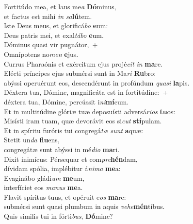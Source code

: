 \evenverse Fortitúdo mea, et laus me\textit{a} \textbf{Dó}minus,~\*\\
\evenverse et factus est mihi \textit{in} \textit{sa}\textbf{lú}tem.\\
\oddverse Iste Deus meus, et glorificá\textit{bo} \textbf{e}um:~\*\\
\oddverse Deus patris mei, et exal\textit{tá}\textit{bo} \textbf{e}um.\\
\evenverse Dóminus quasi vir pugnátor,~+\\
\evenverse  Omnípotens no\textit{men} \textbf{e}jus.~\*\\
\evenverse Currus Pharaónis et exércitum ejus projé\textit{cit} \textit{in} \textbf{ma}re.\\
\oddverse Elécti príncipes ejus submérsi sunt in Ma\textit{ri} \textbf{Ru}bro:~\*\\
\oddverse abýssi operuérunt eos, descendérunt in profúndum \textit{qua}\textit{si} \textbf{la}pis.\\
\evenverse Déxtera tua, Dómine, magnificáta est in fortitúdine:~+\\
\evenverse  déxtera tua, Dómine, percússit i\textit{ni}\textbf{mí}cum.~\*\\
\evenverse Et in multitúdine glóriæ tuæ deposuísti adversá\textit{ri}\textit{os} \textbf{tu}os:\\
\oddverse Misísti iram tuam, quæ devorávit eos si\textit{cut} \textbf{stí}pulam.~\*\\
\oddverse Et in spíritu furóris tui congregá\textit{tæ} \textit{sunt} \textbf{a}quæ:\\
\evenverse Stetit un\textit{da} \textbf{flu}ens,~\*\\
\evenverse congregátæ sunt abýssi in mé\textit{di}\textit{o} \textbf{ma}ri.\\
\oddverse Dixit inimícus: Pérsequar et com\textit{pre}\textbf{hén}dam,~\*\\
\oddverse dívidam spólia, implébitur á\textit{ni}\textit{ma} \textbf{me}a:\\
\evenverse Evaginábo gládi\textit{um} \textbf{me}um,~\*\\
\evenverse interfíciet eos \textit{ma}\textit{nus} \textbf{me}a.\\
\oddverse Flavit spíritus tuus, et opéruit e\textit{os} \textbf{ma}re:~\*\\
\oddverse submérsi sunt quasi plumbum in aquis \textit{ve}\textit{he}\textbf{mén}tibus.\\
\evenverse Quis símilis tui in fórti\textit{bus}, \textbf{Dó}mine?~\*\\
